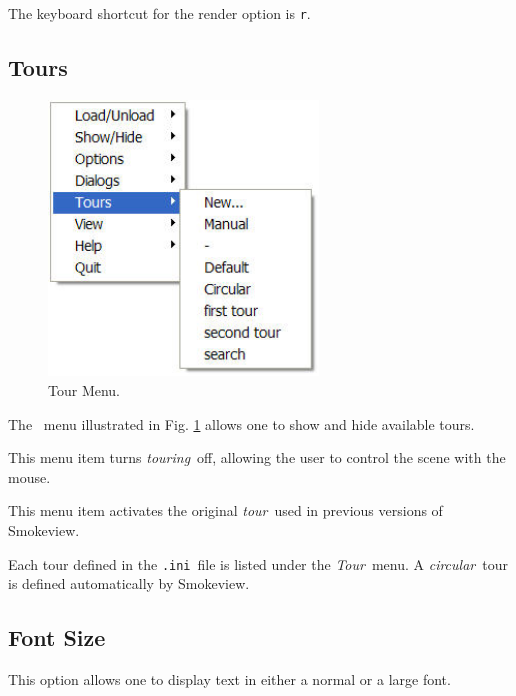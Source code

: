 \documentclass[11pt,twoside]{book}
\newcommand{\parma}{.75}
\newcommand{\parmb}{.5}
\newcommand{\parmc}{0.25}
\newcommand{\blist}{
\begin{list}
{}{
\setlength{\leftmargin}{\parma in}
\setlength{\labelwidth}{\parmb in}
\setlength{\labelsep}{\parmc in}
\setlength{\listparindent}{0.3in}
\setlength{\topsep}{.3in}
\setlength{\parsep}{.0in}
}}
\newcommand{\elist}{\end{list}}
\newcommand{\hitem}[1]{\item[{\bf #1} \hfill]}
\begin{document}
The keyboard shortcut for the render option is {\tt r}.

\subsection{Tours}
\begin{figure}[\figoptions]
\begin{center}
\includegraphics[width=2.8264in]{FIGURES/menu_tour}
\caption{Tour Menu.} \label{fig_tourmenu}
\end{center}
\end{figure}
The \ menu illustrated in Fig. \ref{fig_tourmenu}
allows one to show and hide available tours.


\blist \hitem{Manual}This menu item turns {\em touring}\ off,
allowing the user to control the scene with the mouse.

\hitem{Default}This menu item activates the original {\em tour}\ used
in previous versions of Smokeview.

\hitem{List of tours}Each tour defined in the {\tt .ini}\ file is
listed under the {\em Tour}\ menu.  A {\em circular}\ tour is
defined automatically by Smokeview.

\elist


\subsection{Font Size}This option allows one to display text in either a normal or a large font.
\end{document}
